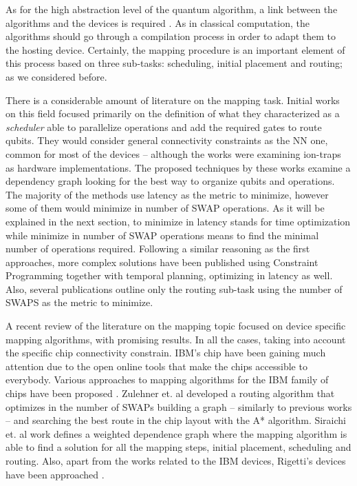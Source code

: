 As for the high abstraction level of the quantum algorithm, a link between the algorithms and the devices is required \cite{Fu_2016}.
As in classical computation, the algorithms should go through a compilation process in order to adapt them to the hosting device.
Certainly, the mapping procedure is an important element of this process based on three sub-tasks: scheduling, initial placement and routing; as we considered before.

There is a considerable amount of literature on the mapping task.
Initial works on this field \cite{Metodi_2006,Whitney_2007,Bahreini_2015} focused primarily on the definition of what they characterized as a \emph{scheduler} able to parallelize operations and add the required gates to route qubits.
They would consider general connectivity constraints as the NN one, common for most of the devices -- although the works were examining ion-traps as hardware implementations.
The proposed techniques by these works examine a dependency graph looking for the best way to organize qubits and operations.
The majority of the methods use latency as the metric to minimize, however some of them \cite{Farghadan_2017} would minimize in number of SWAP operations.
As it will be explained in the next section, to minimize in latency stands for time optimization while minimize in number of SWAP operations means to find the minimal number of operations required.
Following a similar reasoning as the first approaches, more complex solutions \cite{booth18:compar_integ_const_progr_tempor} have been published using Constraint Programming together with temporal planning, optimizing in latency as well.
Also, several publications \cite{Lye_2015,Wille_2016} outline only the routing sub-task using the number of SWAPS as the metric to minimize.

A recent review of the literature on the mapping topic focused on device specific mapping algorithms, with promising results.
In all the cases, taking into account the specific chip connectivity constrain.
IBM's chip have been gaining much attention due to the open online tools that make the chips accessible to everybody.
Various approaches to mapping algorithms for the IBM family of chips have been proposed \cite{zulehner17:effic_method_mappin_quant_circuit,Siraichi_2018,mckay18:qiskit_backen_specif_openq_openp_exper,Dueck_2018}.
Zulehner et. al \cite{zulehner17:effic_method_mappin_quant_circuit} developed a routing algorithm that optimizes in the number of SWAPs building a graph -- similarly to previous works --  and searching the best route in the chip layout with the A* algorithm.
Siraichi et. al \cite{Siraichi_2018} work defines a weighted dependence graph where the mapping algorithm is able to find a solution for all the mapping steps, initial placement, scheduling and routing.
Also, apart from the works related to the IBM devices, Rigetti's devices have been approached \cite{Venturelli_2018}.

